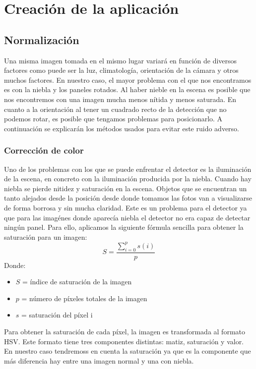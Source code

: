 \documentclass[a4paper, 12pt]{article}
\begin{document}

\section{Creación de la aplicación}
\subsection{Normalización}
Una misma imagen tomada en el mismo lugar variará en función de diversos factores como puede ser la luz, climatología, orientación de la cámara y otros muchos factores. En nuestro caso, el mayor problema con el que nos encontramos es con la niebla y los paneles rotados. Al haber nieble en la escena es posible que nos encontremos con una imagen mucha menos nítida y menos saturada. En cuanto a la orientación al tener un cuadrado recto de la detección que no podemos rotar, es posible que tengamos problemas para posicionarlo. A continuación se explicarán los métodos usados para evitar este ruido adverso.
\subsubsection{Corrección de color}
Uno de los problemas con los que se puede enfrentar el detector es la iluminación de la escena, en concreto con la iluminación producida por la niebla. Cuando hay niebla se pierde nitidez y saturación en la escena. Objetos que se encuentran un tanto alejados desde la posición desde donde tomamos las fotos van a visualizarse de forma borrosa y sin mucha claridad. Este es un problema para el detector ya que para las imagénes donde aparecía niebla el detector no era capaz de detectar ningún panel.
Para ello, aplicamos la siguiente fórmula sencilla para obtener la saturación para un imagen:
	\begin{equation}
		S = \frac{\sum_{i=0}^p s(i)}{p}
	\end{equation}
Donde:
\begin{itemize}
    \item $S$ = índice de saturación de la imagen
    \item $p$ = número de píxeles totales de la imagen
    \item $s$ = saturación del píxel i
\end{itemize}
Para obtener la saturación de cada píxel, la imagen es transformada al formato HSV. Este formato tiene tres componentes distintas: matiz, saturación y valor. En nuestro caso tendremoss en cuenta la saturación ya que es la componente que más diferencia hay entre una imagen normal y una con niebla.
\end{document}
